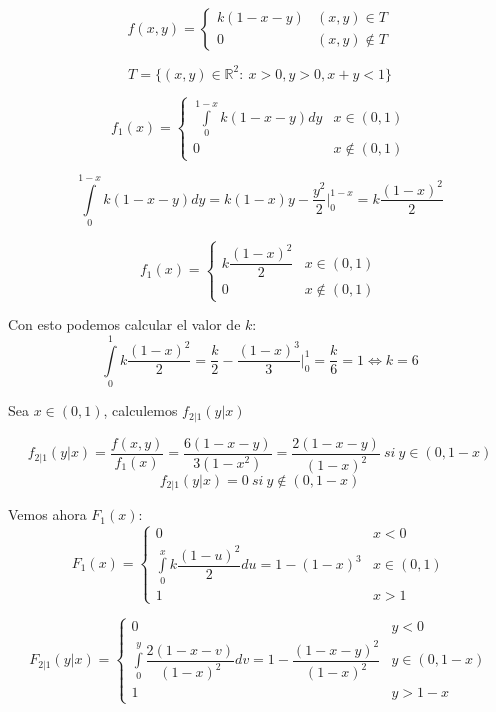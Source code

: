 \documentclass[openany]{book}
\begin{document}
\begin{exercise}
    $$ f(x,y) = \left\{
    \begin{array}{ll}
        k(1-x-y) & (x,y) \in T\\
        0 & (x,y) \not \in T
    \end{array}
    \right. $$

    $$ T = \{(x,y) \in \mathbb{R} ^2:\ x>0,y>0,x+y<1\} $$

    $$ f_{1}(x) = \left\{
    \begin{array}{ll}
        \int\limits_{0}^{1-x} k(1-x-y)dy & x \in (0,1)\\
        0 & x \not \in (0,1)
    \end{array}
    \right. $$

    $$ \int\limits_{0}^{1-x} k(1-x-y)dy = k (1-x)y - \dfrac{y^2}{2} \Biggr|_{0}^{1-x} = k \dfrac{(1-x)^2}{2} $$

    
    $$ f_{1}(x) = \left\{
        \begin{array}{ll}
            k \dfrac{(1-x)^2}{2} & x \in (0,1)\\
            0 & x \not \in (0,1)
        \end{array}
        \right. 
    $$

    Con esto podemos calcular el valor de $ k $:
    $$ \int\limits_{0}^{1}k \dfrac{(1-x)^2}{2} = \dfrac{k}{2} -\dfrac{(1-x)^3}{3} \Biggr|_{0}^{1} = \dfrac{k}{6} = 1 \iff k = 6 $$

    Sea $ x \in (0,1) $, calculemos $ f_{2|1}(y|x) $

    $$ f_{2|1}(y|x) = \dfrac{f(x,y)}{f_{1}(x)} = \dfrac{6(1-x-y)}{3(1-x^2)} = \dfrac{2(1-x-y)}{(1-x)^2}\ si\ y \in (0,1-x) $$
    $$ f_{2|1}(y|x) = 0\ si\ y \not \in (0,1-x) $$

    Vemos ahora $ F_{1}(x) $:
    $$ F_{1}(x) = \left\{
    \begin{array}{ll}
        0 & x < 0\\
        \int\limits_{0}^{x} k \dfrac{(1-u)^2}{2} du = 1-(1-x)^3 & x \in (0,1)\\
        1 & x > 1
    \end{array}
    \right. $$

    $$ F_{2|1}(y|x) = \left\{
    \begin{array}{ll}
        0 & y < 0\\
        \int\limits_{0}^{y} \dfrac{2(1-x-v)}{(1-x)^2}dv = 1- \dfrac{(1-x-y)^2}{(1-x)^2} & y \in (0,1-x)\\
        1 & y > 1-x
    \end{array}
    \right. $$


\end{exercise}
\end{document}
